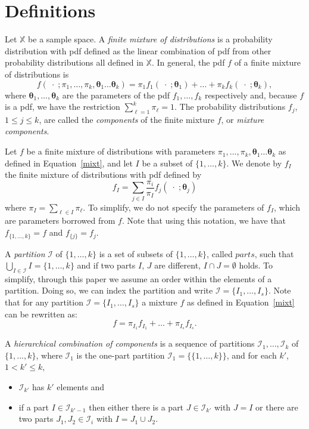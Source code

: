 \documentclass[10pt, a4paper]{article}
\newcommand{\m}[1]{\boldsymbol{#1}}
\begin{document}
\section{Definitions}
\label{definitions}

Let $\mathbb{X}$ be a sample space. A \emph{finite mixture of distributions} is a probability distribution with pdf defined as the linear combination of pdf from other probability distributions all defined in $\mathbb{X}$. In general, the pdf $f$ of a finite mixture of distributions is
\begin{equation}\label{mixt}
f(\;\cdot\; ; \pi_1, \dots, \pi_k, \m\theta_1 \dots \m\theta_k) = \pi_1 f_1(\;\cdot\; ; \m\theta_1) + \dots + \pi_k f_k(\;\cdot\; ; \m\theta_k),
\end{equation}
where $\m\theta_1, \dots,  \m\theta_k$ are the parameters of the pdf $f_1, \dots, f_k$ respectively and, because $f$ is a pdf, we have the restriction $\sum_{\ell = 1}^k \pi_\ell = 1$. The probability distributions $f_j$, $1 \leq j \leq k$, are called the \emph{components} of the finite mixture $f$, or \emph{mixture components}.

Let $f$ be a finite mixture of distributions with  parameters  $\pi_1, \dots, \pi_k, \m\theta_1 \dots \m\theta_k$ as defined in Equation~\ref{mixt}, and let $I$  be a subset of $\{1, \dots, k\}$. We denote by $f_I$ the finite mixture of distributions with pdf defined by
\[
f_I = \sum_{j \in I} \frac{\pi_i}{\pi_I} f_j(\;\cdot\; ; \m\theta_j)
\]
where $\pi_I = \sum_{\ell \in I} \pi_\ell$. To simplify, we do not specify the parameters of $f_I$, which are parameters borrowed from $f$. Note that using this notation, we have that $f_{\{1, \dots, k\}} = f$ and $f_{\{j\}} = f_j$.

A \emph{partition} $\mathcal{I}$ of $\{1, \dots, k\}$ is a set of subsets of $\{1, \dots, k\}$, called $parts$, such that $\bigcup_{I \in \mathcal{I}} I = \{1, \dots, k\}$ and  if two parts $I$, $J$ are different, $I \cap J = \emptyset$ holds. To simplify, through this paper we assume an order within the elements of a partition. Doing so, we can index the partition and write $\mathcal{I} = \{ I_1, \dots, I_s\}$. Note that for any partition $\mathcal{I} = \{ I_1, \dots, I_s\}$ a mixture $f$ as defined in Equation~\ref{mixt} can be rewritten as:
\[
f = \pi_{I_1} f_{I_1} + \dots + \pi_{I_s} f_{I_s}.
\]


A \emph{hierarchical combination of components} is a sequence of partitions $\mathcal{I}_1, \dots, \mathcal{I}_k$ of $\{1,...,k\}$, where $\mathcal{I}_1$ is the one-part partition $\mathcal{I}_1 = \{ \{1, \dots, k\} \}$, and for each $k'$, $1 <  k' \leq k$,
\begin{itemize}
\item $\mathcal{I}_{k'}$ has $k'$ elements  and
\item if a part $I \in \mathcal{I}_{k'-1}$ then either there is a part $J \in \mathcal{I}_{k'}$ with $J = I$ or there are two parts $J_1, J_2 \in \mathcal{I}_i$ with $I = J_1 \cup J_2$.
\end{itemize}
\end{document}

